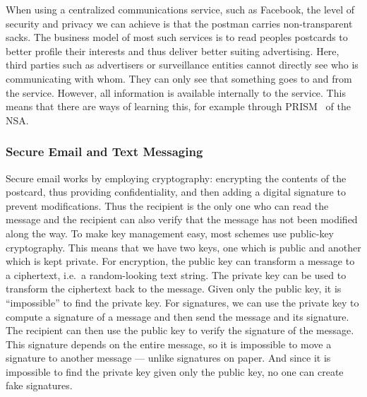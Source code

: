 When using a centralized communications service, such as Facebook, the
level of security and privacy we can achieve is that the postman
carries non-transparent sacks.  The business model of most such
services is to read peoples postcards to better profile their
interests and thus deliver better suiting advertising.  Here, third
parties such as advertisers or surveillance entities cannot directly
see who is communicating with whom.  They can only see that something
goes to and from the service.  However, all information is available
internally to the service.  This means that there are ways of learning
this, for example through PRISM~\cite{Prism} of the
\ac{NSA}.%

\subsubsection{Secure Email and Text Messaging}

Secure email works by employing cryptography:  encrypting the contents of the 
postcard, thus providing confidentiality, and then adding a digital signature to 
prevent modifications.
Thus the recipient is the only one who can read the message and the recipient 
can also verify that the message has not been modified along the way.
To make key management easy, most schemes use public-key cryptography.
This means that we have two keys, one which is public and another which is kept
private.
For encryption, the public key can transform a message to a ciphertext, i.e.\ 
a random-looking text string.
The private key can be used to transform the ciphertext back to the message.
Given only the public key, it is \enquote{impossible} to find the private key.
For signatures, we can use the private key to compute a signature of a message 
and then send the message and its signature.
The recipient can then use the public key to verify the signature of the 
message.
This signature depends on the entire message, so it is impossible to move 
a signature to another message --- unlike signatures on paper.
And since it is impossible to find the private key given only the public key, 
no one can create fake signatures.

